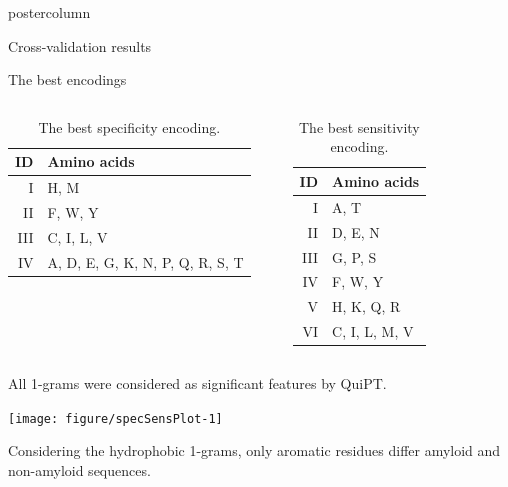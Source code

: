 \documentclass[final]{beamer}\usepackage[]{graphicx}\usepackage[]{color}
\newenvironment{knitrout}{}{} %
\begin{document}
\begin{frame}
\begin{columns}
\begin{column}{.525\textwidth}
\begin{beamercolorbox}[center,wd=\textwidth]{postercolumn}
\begin{minipage}[T]{.95\textwidth}
{\begin{block}{Cross-validation results}
\end{block}
\vfill


\begin{block}{The best encodings}
\begin{columns}

\begin{table}[ht]
\centering
\caption{The best specificity encoding.} 
\begin{tabular}{r | l}
\toprule
ID & Amino acids \\ 
\midrule
I & H, M \\ 
\rowcolor[gray]{0.85}II & F, W, Y \\ 
III &  C, I, L, V \\ 
\rowcolor[gray]{0.85}IV &  A, D, E, G, K, N, P, Q, R, S, T \\ 
\bottomrule
\end{tabular}
\label{tab:best}
\end{table}


\begin{table}[ht]
\centering
\caption{The best sensitivity encoding.} 
\begin{tabular}{r | l}
\toprule
ID & Amino acids \\ 
\midrule
I & A, T \\ 
\rowcolor[gray]{0.85}II & D, E, N \\ 
III & G, P, S \\ 
\rowcolor[gray]{0.85}IV &  F, W, Y \\ 
V & H, K, Q, R \\ 
\rowcolor[gray]{0.85}VI &  C, I, L, M, V \\ 
\bottomrule
\end{tabular}
\label{tab:best}
\end{table}

\end{columns}

All 1-grams were considered as significant features by QuiPT.

\begin{knitrout}
\color{fgcolor}
\texttt{[image: figure/specSensPlot-1]} 

\end{knitrout}

Considering the hydrophobic 1-grams, only aromatic residues differ amyloid and non-amyloid sequences.

\end{block}
\vfill

}
\end{minipage}
\end{beamercolorbox}
\end{column}
\end{columns}
\end{frame}
\end{document}
